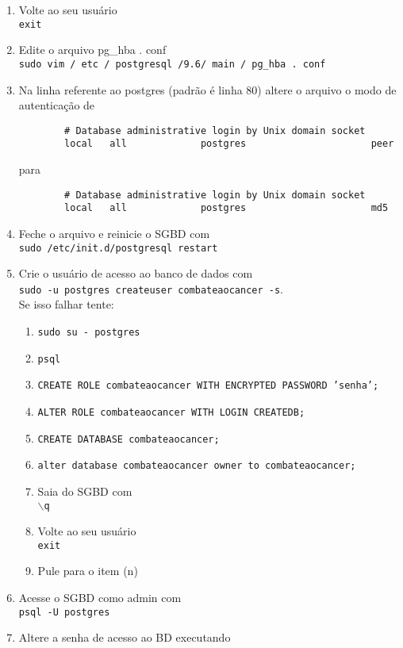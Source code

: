 \documentclass[12pt,a4paper]{article}
\begin{document}
\begin{enumerate}
\begin{enumerate}
		\item Volte ao seu usuário\\
		\texttt{exit}
		\item Edite o arquivo pg\_hba . conf\\
		\texttt{sudo vim / etc / postgresql /9.6/ main / pg\_hba . conf}
		\item Na linha referente ao postgres (padrão é linha 80) altere o arquivo o modo de autenticação de
		\begin{verbatim}
		# Database administrative login by Unix domain socket
		local   all             postgres                      peer
		\end{verbatim}
		para
		\begin{verbatim}
		# Database administrative login by Unix domain socket
		local   all             postgres                      md5
		\end{verbatim}
		\item Feche o arquivo e reinicie o SGBD com \\
		\texttt{sudo /etc/init.d/postgresql restart}
		\item Crie o usuário de acesso ao banco de dados com  \\
		\texttt{sudo -u postgres createuser combateaocancer -s}.\\
		Se isso falhar tente:
		\begin{enumerate}
			\item \texttt{sudo su - postgres}
			\item \texttt{psql}
			\item \texttt{CREATE ROLE combateaocancer WITH ENCRYPTED PASSWORD 'senha';}
			\item \texttt{ALTER ROLE combateaocancer WITH LOGIN CREATEDB;}
			\item \texttt{CREATE DATABASE combateaocancer;}
			\item \texttt{alter database combateaocancer owner to combateaocancer;}
			\item Saia do SGBD com \\
			\texttt{$\backslash$q}
			\item Volte ao seu usuário\\
			\texttt{exit}
			\item Pule para o item (n)
		\end{enumerate}
		\item Acesse o SGBD como admin com \\
		\texttt{psql -U postgres}
		\item Altere a senha de acesso ao BD executando \\

\end{enumerate}
\end{enumerate}
\end{document}
